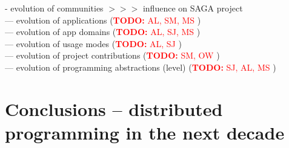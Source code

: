 \documentclass{article}
\newcommand{\B}[1]{\textbf{#1}}
\newcommand{\nind}{\noindent}
\newcommand{\todo}[1]{{\textcolor{red}{\B{TODO:} #1 }}}
\begin{document}
 \nind
 - evolution of communities  $>>>$ influence on SAGA project\\
 --- evolution of applications (\todo{AL, SM, MS})\\
 --- evolution of app domains (\todo{AL, SJ, MS})\\
 --- evolution of usage modes (\todo{AL, SJ})\\
 --- evolution of project contributions (\todo{SM, OW})\\
 --- evolution of programming abstractions (level) (\todo{SJ, AL, MS})\\


\section{Conclusions -- distributed programming in the next decade}

\footnotesize


\end{document}
